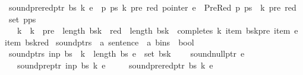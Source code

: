 \begin{isabellebody}
\ \ {\isachardoublequoteopen}sound{\isacharunderscore}{\kern0pt}prered{\isacharunderscore}{\kern0pt}ptr\ bs\ k\ e\ {\isacharequal}{\kern0pt}\ {\isacharparenleft}{\kern0pt}{\isasymforall}p\ ps\ k{\isacharprime}{\kern0pt}\ pre\ red{\isachardot}{\kern0pt}\ pointer\ e\ {\isacharequal}{\kern0pt}\ PreRed\ p\ ps\ {\isasymand}\ {\isacharparenleft}{\kern0pt}k{\isacharprime}{\kern0pt}{\isacharcomma}{\kern0pt}\ pre{\isacharcomma}{\kern0pt}\ red{\isacharparenright}{\kern0pt}\ {\isasymin}\ set\ {\isacharparenleft}{\kern0pt}p{\isacharhash}{\kern0pt}ps{\isacharparenright}{\kern0pt}\ {\isasymlongrightarrow}\isanewline
\ \ \ \ k{\isacharprime}{\kern0pt}\ {\isacharless}{\kern0pt}\ k\ {\isasymand}\ pre\ {\isacharless}{\kern0pt}\ length\ {\isacharparenleft}{\kern0pt}bs{\isacharbang}{\kern0pt}k{\isacharprime}{\kern0pt}{\isacharparenright}{\kern0pt}\ {\isasymand}\ red\ {\isacharless}{\kern0pt}\ length\ {\isacharparenleft}{\kern0pt}bs{\isacharbang}{\kern0pt}k{\isacharparenright}{\kern0pt}\ {\isasymand}\ completes\ k\ {\isacharparenleft}{\kern0pt}item\ {\isacharparenleft}{\kern0pt}bs{\isacharbang}{\kern0pt}k{\isacharprime}{\kern0pt}{\isacharbang}{\kern0pt}pre{\isacharparenright}{\kern0pt}{\isacharparenright}{\kern0pt}\ {\isacharparenleft}{\kern0pt}item\ e{\isacharparenright}{\kern0pt}\ {\isacharparenleft}{\kern0pt}item\ {\isacharparenleft}{\kern0pt}bs{\isacharbang}{\kern0pt}k{\isacharbang}{\kern0pt}red{\isacharparenright}{\kern0pt}{\isacharparenright}{\kern0pt}{\isacharparenright}{\kern0pt}{\isachardoublequoteclose}\isanewline
\isanewline
{}\isamarkupfalse%
\ sound{\isacharunderscore}{\kern0pt}ptrs\ {\isacharcolon}{\kern0pt}{\isacharcolon}{\kern0pt}\ {\isachardoublequoteopen}{\isacharprime}{\kern0pt}a\ sentence\ {\isasymRightarrow}\ {\isacharprime}{\kern0pt}a\ bins\ {\isasymRightarrow}\ bool{\isachardoublequoteclose}\ \isanewline
\ \ {\isachardoublequoteopen}sound{\isacharunderscore}{\kern0pt}ptrs\ inp\ bs\ {\isacharequal}{\kern0pt}\ {\isacharparenleft}{\kern0pt}{\isasymforall}k\ {\isacharless}{\kern0pt}\ length\ bs{\isachardot}{\kern0pt}\ {\isasymforall}e\ {\isasymin}\ set\ {\isacharparenleft}{\kern0pt}bs{\isacharbang}{\kern0pt}k{\isacharparenright}{\kern0pt}{\isachardot}{\kern0pt}\isanewline
\ \ \ \ sound{\isacharunderscore}{\kern0pt}null{\isacharunderscore}{\kern0pt}ptr\ e\ {\isasymand}\isanewline
\ \ \ \ sound{\isacharunderscore}{\kern0pt}pre{\isacharunderscore}{\kern0pt}ptr\ inp\ bs\ k\ e\ {\isasymand}\isanewline
\ \ \ \ sound{\isacharunderscore}{\kern0pt}prered{\isacharunderscore}{\kern0pt}ptr\ bs\ k\ e{\isacharparenright}{\kern0pt}{\isachardoublequoteclose}\isanewline

\end{isabellebody}
